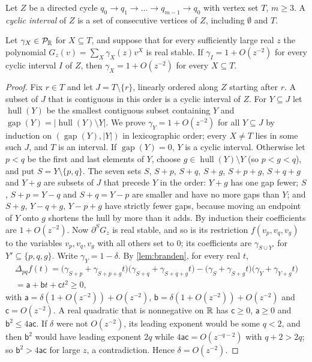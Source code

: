 Let $Z$ be a directed cycle $q_0\to q_1\to\dots\to q_{m-1}\to q_0$ with vertex set $T$, $m\ge3$. A \emph{cyclic interval} of $Z$ is a set of consecutive vertices of $Z$, including $\emptyset$ and $T$.

\begin{lemma}[tameness]\label{lem:tameness}
Let $\gamma_X\in\mathcal{P}_{\mathbb{R}}$ for $X\subseteq T$, and suppose that for every sufficiently large real $z$ the polynomial $G_z(v)=\sum_{X}\gamma_X(z)v^X$ is real stable. If $\gamma_I=1+O(z^{-2})$ for every cyclic interval $I$ of $Z$, then $\gamma_X=1+O(z^{-2})$ for every $X\subseteq T$.
\end{lemma}

\begin{proof}
Fix $r\in T$ and let $J=T\setminus\{r\}$, linearly ordered along $Z$ starting after $r$. A subset of $J$ that is contiguous in this order is a cyclic interval of $Z$. For $Y\subseteq J$ let $\operatorname{hull}(Y)$ be the smallest contiguous subset containing $Y$ and $\operatorname{gap}(Y)=|\operatorname{hull}(Y)\setminus Y|$. We prove $\gamma_Y=1+O(z^{-2})$ for all $Y\subseteq J$ by induction on $(\operatorname{gap}(Y),|Y|)$ in lexicographic order; every $X\ne T$ lies in some such $J$, and $T$ is an interval.
If $\operatorname{gap}(Y)=0$, $Y$ is a cyclic interval. Otherwise let $p<q$ be the first and last elements of $Y$, choose $g\in\operatorname{hull}(Y)\setminus Y$ (so $p<g<q$), and put $S=Y\setminus\{p,q\}$. The seven sets $S$, $S+p$, $S+q$, $S+g$, $S+p+g$, $S+q+g$ and $Y+g$ are subsets of $J$ that precede $Y$ in the order: $Y+g$ has one gap fewer; $S$, $S+p=Y-q$ and $S+q=Y-p$ are smaller and have no more gaps than $Y$; and $S+g$, $Y-q+g$, $Y-p+g$ have strictly fewer gaps, because moving an endpoint of $Y$ onto $g$ shortens the hull by more than it adds. By induction their coefficients are $1+O(z^{-2})$.
Now $\partial^S G_z$ is real stable, and so is its restriction $f(v_p,v_q,v_g)$ to the variables $v_p,v_q,v_g$ with all others set to $0$; its coefficients are $\gamma_{S\cup Y'}$ for $Y'\subseteq\{p,q,g\}$. Write $\gamma_Y=1-\delta$. By \cref{lem:branden}, for every real $t$,
\begin{multline*}
\Delta_{pq}f(t)=\bigl(\gamma_{S+p}+\gamma_{S+p+g}t\bigr)\bigl(\gamma_{S+q}+\gamma_{S+q+g}t\bigr)-\bigl(\gamma_S+\gamma_{S+g}t\bigr)\bigl(\gamma_Y+\gamma_{Y+g}t\bigr)\\
=\mathsf a+\mathsf bt+\mathsf ct^2\ge0,
\end{multline*}
with $\mathsf a=\delta(1+O(z^{-2}))+O(z^{-2})$, $\mathsf b=\delta(1+O(z^{-2}))+O(z^{-2})$ and $\mathsf c=O(z^{-2})$. A real quadratic that is nonnegative on $\mathbb{R}$ has $\mathsf c\ge0$, $\mathsf a\ge0$ and $\mathsf b^2\le4\mathsf a\mathsf c$. If $\delta$ were not $O(z^{-2})$, its leading exponent would be some $q<2$, and then $\mathsf b^2$ would have leading exponent $2q$ while $4\mathsf a\mathsf c=O(z^{-q-2})$ with $q+2>2q$; so $\mathsf b^2>4\mathsf a\mathsf c$ for large $z$, a contradiction. Hence $\delta=O(z^{-2})$.
\end{proof}

